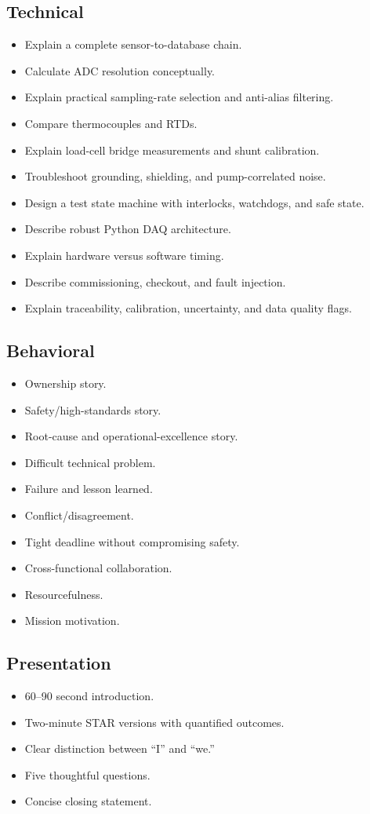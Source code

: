 \documentclass[11pt]{article}
\begin{document}
\subsection{Technical}
\begin{itemize}
  \item Explain a complete sensor-to-database chain.
  \item Calculate ADC resolution conceptually.
  \item Explain practical sampling-rate selection and anti-alias filtering.
  \item Compare thermocouples and RTDs.
  \item Explain load-cell bridge measurements and shunt calibration.
  \item Troubleshoot grounding, shielding, and pump-correlated noise.
  \item Design a test state machine with interlocks, watchdogs, and safe state.
  \item Describe robust Python DAQ architecture.
  \item Explain hardware versus software timing.
  \item Describe commissioning, checkout, and fault injection.
  \item Explain traceability, calibration, uncertainty, and data quality flags.
\end{itemize}

\subsection{Behavioral}
\begin{itemize}
  \item Ownership story.
  \item Safety/high-standards story.
  \item Root-cause and operational-excellence story.
  \item Difficult technical problem.
  \item Failure and lesson learned.
  \item Conflict/disagreement.
  \item Tight deadline without compromising safety.
  \item Cross-functional collaboration.
  \item Resourcefulness.
  \item Mission motivation.
\end{itemize}

\subsection{Presentation}
\begin{itemize}
  \item 60--90 second introduction.
  \item Two-minute STAR versions with quantified outcomes.
  \item Clear distinction between ``I'' and ``we.''
  \item Five thoughtful questions.
  \item Concise closing statement.
\end{itemize}
\end{document}
